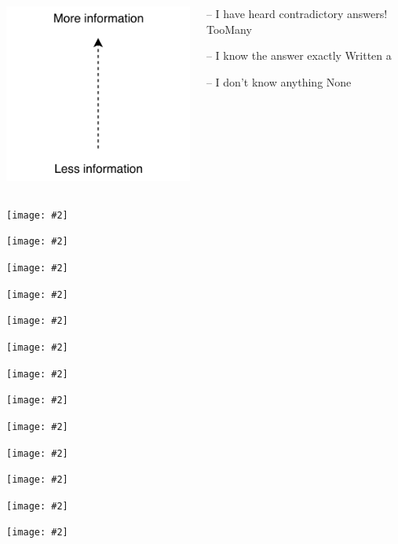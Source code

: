 \documentclass[UKenglish,usenames,dvipsnames,svgnames,table,aspectratio=169,mathserif]{beamer}
\newcommand{\imageslide}[2][1]{{
\begin{frame}\begin{center}
\texttt{[image: \#2]}
\end{center}\end{frame}
}}
\begin{document}
\begin{frame}[fragile]

\begin{columns}

\begin{column}{0.3\textwidth}
\includegraphics[scale=1.3]{set/more-info.pdf}
\end{column}

\begin{column}{0.6\textwidth}
\begin{haskellcode}
  -- I have heard contradictory answers!
    TooMany

  -- I know the answer exactly
    Written a

  -- I don't know anything
    None
\end{haskellcode}

\end{column}

\end{columns}
\end{frame}


\imageslide[0.6]{sudoku/sudoku1.png}
\imageslide[0.6]{sudoku/sudoku2.png}
\imageslide[0.6]{sudoku/sudoku3.png}
\imageslide[0.6]{sudoku/sudoku4.png}
\imageslide[0.6]{sudoku/sudoku5.png}
\imageslide[0.6]{sudoku/sudoku6.png}
\imageslide[0.6]{sudoku/sudoku7.png}
\imageslide[0.6]{sudoku/sudoku8.png}
\imageslide[0.6]{sudoku/sudoku9.png}
\imageslide[0.6]{sudoku/sudoku10.png}
\imageslide[0.6]{sudoku/sudoku11.png}
\imageslide[0.6]{sudoku/sudoku12.png}
\imageslide[0.6]{sudoku/sudoku13.png}
\end{document}
